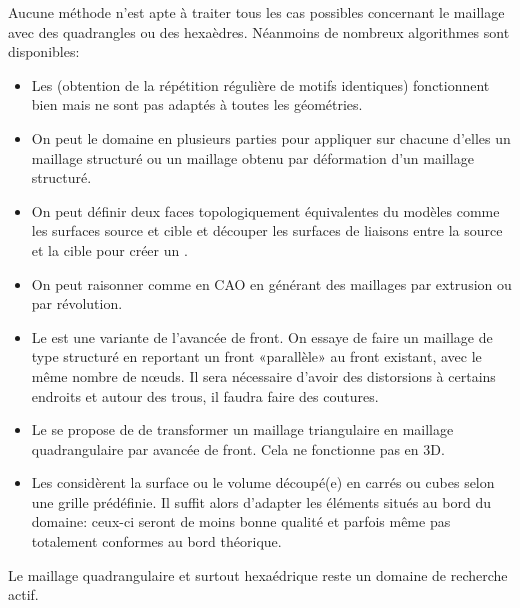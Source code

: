 \medskip
Aucune méthode n'est apte à traiter tous les cas possibles concernant le maillage avec des quadrangles ou des hexaèdres. Néanmoins de nombreux algorithmes sont disponibles:
\begin{itemize}
   \item Les  (obtention de la répétition régulière de motifs identiques) fonctionnent bien mais ne sont pas adaptés à toutes les géométries.
   \item On peut  le domaine en plusieurs parties pour appliquer sur chacune d'elles un maillage structuré ou un maillage obtenu par déformation d'un maillage structuré.
   \item On peut définir deux faces topologiquement équivalentes du modèles comme les surfaces source et cible et découper les surfaces de liaisons entre la source et la cible pour créer un .
   \item On peut raisonner comme en CAO en générant des maillages par extrusion ou par révolution.
   \item Le  est une variante de l'avancée de front. On essaye de faire un maillage de type structuré en reportant un front «parallèle» au front existant, avec le même nombre de nœuds. Il sera nécessaire d'avoir des distorsions  à certains endroits et autour des trous, il faudra faire des coutures.
   \item Le  se propose de de transformer un maillage triangulaire en maillage quadrangulaire par avancée de front. Cela ne fonctionne pas en 3D.
   \item Les  considèrent la surface ou le volume découpé(e) en carrés ou cubes selon une grille prédéfinie. Il suffit alors d'adapter les éléments situés au bord du domaine: ceux-ci seront de moins bonne qualité et parfois même pas totalement conformes au bord théorique.
\end{itemize}
Le maillage quadrangulaire et surtout hexaédrique reste un domaine de recherche actif.
